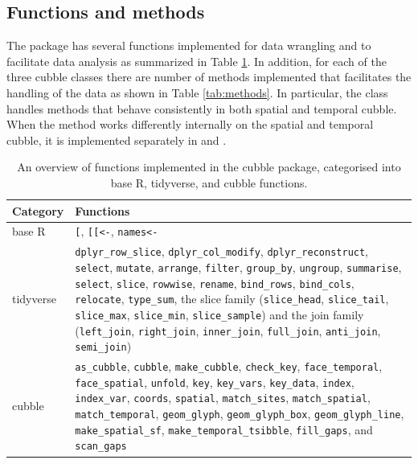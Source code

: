 \documentclass[
  shortnames]{jss}
\begin{document}
\hypertarget{functions-and-methods}{%
\subsection{Functions and methods}\label{functions-and-methods}}

The  package has several functions implemented for data wrangling and to facilitate data analysis as summarized in Table \ref{tab:funs}. In addition, for each of the three cubble classes there are number of methods implemented that facilitates the handling of the data as shown in Table \ref{tab:methods}. In particular, the  class handles methods that behave consistently in both spatial and temporal cubble. When the method works differently internally on the spatial and temporal cubble, it is implemented separately in  and .

\begin{table}
\begin{tabular}{p{}p{}}
\hline
Category & Functions \\
\hline
base R & \texttt{{[}}, \texttt{{[}{[}\textless{}-}, \texttt{names\textless{}-} \\
tidyverse & \texttt{dplyr\_row\_slice}, \texttt{dplyr\_col\_modify}, \texttt{dplyr\_reconstruct}, \texttt{select}, \texttt{mutate}, \texttt{arrange}, \texttt{filter}, \texttt{group\_by}, \texttt{ungroup}, \texttt{summarise}, \texttt{select}, \texttt{slice}, \texttt{rowwise}, \texttt{rename}, \texttt{bind\_rows}, \texttt{bind\_cols}, \texttt{relocate}, \texttt{type\_sum}, the slice family (\texttt{slice\_head}, \texttt{slice\_tail}, \texttt{slice\_max}, \texttt{slice\_min}, \texttt{slice\_sample}) and the join family (\texttt{left\_join}, \texttt{right\_join}, \texttt{inner\_join}, \texttt{full\_join}, \texttt{anti\_join}, \texttt{semi\_join}) \\
cubble & \texttt{as\_cubble}, \texttt{cubble}, \texttt{make\_cubble}, \texttt{check\_key}, \texttt{face\_temporal}, \texttt{face\_spatial}, \texttt{unfold}, \texttt{key}, \texttt{key\_vars}, \texttt{key\_data}, \texttt{index}, \texttt{index\_var}, \texttt{coords}, \texttt{spatial}, \texttt{match\_sites}, \texttt{match\_spatial}, \texttt{match\_temporal}, \texttt{geom\_glyph}, \texttt{geom\_glyph\_box}, \texttt{geom\_glyph\_line}, \texttt{make\_spatial\_sf}, \texttt{make\_temporal\_tsibble}, \texttt{fill\_gaps}, and \texttt{scan\_gaps} \\
\hline
\end{tabular}
\caption{An overview of functions implemented in the cubble package, categorised into base R, tidyverse, and cubble functions.}
\label{tab:funs}
\end{table}
\end{document}
